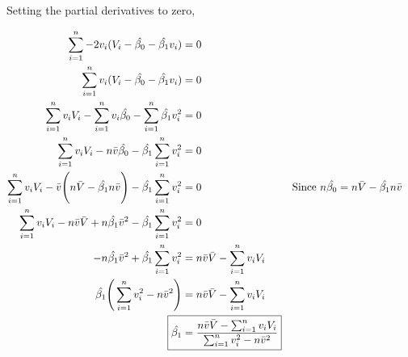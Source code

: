 \documentclass{article}
\begin{document}
Setting the partial derivatives to zero,

\begin{align*} 
\sum_{i=1}^{n} -2v_i(V_i - \hat{\beta_0} - \hat{\beta_1}v_i) &= 0   \\
\sum_{i=1}^{n} v_i(V_i - \hat{\beta_0} - \hat{\beta_1}v_i) &= 0   \\
\sum_{i=1}^{n} v_iV_i - \sum_{i=1}^{n} v_i\hat{\beta_0} - \sum_{i=1}^{n} \hat{\beta_1}v_i^2 &= 0   \\
\sum_{i=1}^{n} v_iV_i - n\bar{v}\hat{\beta_0} - \hat{\beta_1} \sum_{i=1}^{n} v_i^2 &= 0   \\
\sum_{i=1}^{n} v_iV_i - \bar{v}\Bigg(n \bar{V} - \hat{\beta_1}n\bar{v}\Bigg) - \hat{\beta_1} \sum_{i=1}^{n} v_i^2 &= 0 & \text{Since\ } n\hat{\beta_0} &= n \bar{V} - \hat{\beta_1}n\bar{v}   \\
\sum_{i=1}^{n} v_iV_i - n\bar{v}\bar{V} + n\hat{\beta_1}\bar{v}^2 - \hat{\beta_1} \sum_{i=1}^{n} v_i^2 &= 0  \\
- n\hat{\beta_1}\bar{v}^2 + \hat{\beta_1} \sum_{i=1}^{n} v_i^2 &= n\bar{v}\bar{V} - \sum_{i=1}^{n} v_iV_i   \\
\hat{\beta_1}\Bigg( \sum_{i=1}^{n} v_i^2 - n\bar{v}^2\Bigg) &= n\bar{v}\bar{V} - \sum_{i=1}^{n} v_iV_i   \\
\Aboxed{\hat{\beta_1} &= \frac{n\bar{v}\bar{V} - \sum_{i=1}^{n} v_iV_i}{\sum_{i=1}^{n} v_i^2 - n\bar{v}^2}}
\end{align*} 
\end{document}
